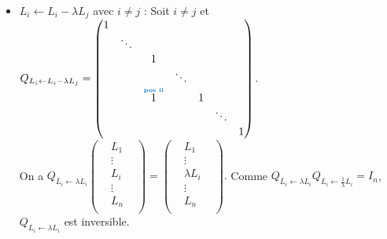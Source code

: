 \documentclass{book}
\begin{document}
\begin{Demonstration}
\begin{itemize}
\item $L_i\leftarrow  L_i- \lambda L_j $ avec $i\neq j$  : Soit $i\neq j$ et 
$Q_{L_i\leftarrow  L_i- \lambda L_j }=
\begin{pmatrix}
1&        &    &&&&\\
 &\ddots  &   &&&&\\
 &        &1  &  &&& \\
 &        &   &\ddots&&&\\
 &        &\overset{\text{{\tiny \propri{pos ii}}}}{1}   &      &1 &&\\
 &        &   &      & & \ddots &  \\
 &        &   &      & &  &1    \\
\end{pmatrix} $.\\
On a $Q_{L_i\leftarrow \lambda L_i } \begin{pmatrix}
& L_1 & \\
& \vdots & \\
& L_i & \\
& \vdots & \\
&  L_n & \\
\end{pmatrix}=\begin{pmatrix}
& L_1 & \\
& \vdots & \\
& \lambda L_i & \\
& \vdots & \\
&  L_n & \\
\end{pmatrix}.$ Comme $Q_{L_i\leftarrow \lambda L_i}Q_{L_i\leftarrow \frac 1 \lambda L_i}=I_n$,$ Q_{L_i\leftarrow \lambda L_i}$ est inversible.
\end{itemize} 
\end{Demonstration}
\end{document}
